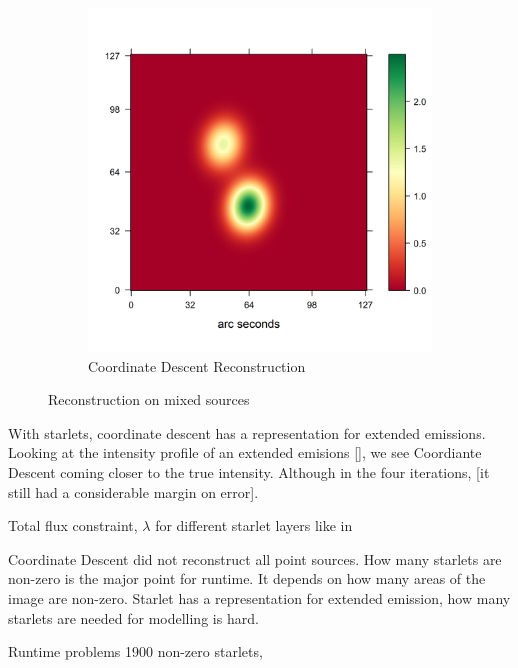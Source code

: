 \begin{figure}[h]
\begin{subfigure}[b]{0.4\linewidth}
		\includegraphics[width=\linewidth]{./chapters/20.results/points/tclean_points.png}
		\caption{Coordinate Descent Reconstruction}
		\label{results:mixed:cd}
	\end{subfigure}
	\caption{Reconstruction on mixed sources}
	\label{results:mixed}
\end{figure}

With starlets, coordinate descent has a representation for extended emissions. Looking at the intensity profile of an extended emisions \ref{}, we see Coordiante Descent coming closer to the true intensity. Although in the four iterations,  [it still had a considerable margin on error]. 

Total flux constraint, $\lambda$ for different starlet layers like in \cite{girard2015sparse}

Coordinate Descent did not reconstruct all point sources. How many starlets are non-zero is the major point for runtime. It depends on how many areas of the image are non-zero. Starlet has a representation for extended emission, how many starlets are needed for modelling is hard.

Runtime problems
1900 non-zero starlets, 
